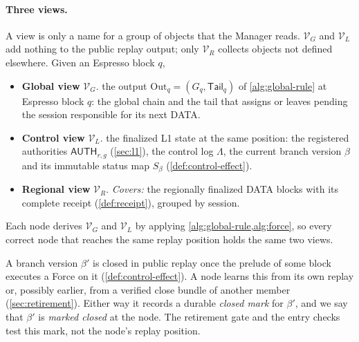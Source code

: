 \documentclass[11pt,a4paper]{article}
\newcommand{\tagg}[1]{\ensuremath{\mathsf{#1}}}
\newcommand{\defterm}[1]{\textcolor{rrBlue}{\textit{#1}}}
\begin{document}
\paragraph{Three views.}
A view is only a name for a group of objects that the Manager reads.
$\mathcal V_G$ and $\mathcal V_L$ add nothing to the public replay
output; only $\mathcal V_R$ collects objects not defined elsewhere. Given an Espresso block $q$,
\begin{itemize}
\item \textbf{Global view} $\mathcal V_G$. the output
$\mathrm{Out}_q=(G_q,\mathsf{Tail}_q)$ of \cref{alg:global-rule} at Espresso
block $q$: the global chain and the tail that assigns or leaves pending
the session responsible for its next DATA.
\item \textbf{Control view} $\mathcal V_L$. the finalized
L1 state at the same position: the registered authorities
$\tagg{AUTH}_{r,g}$ (\cref{sec:l1}), the control log $\Lambda$, the
current branch version $\beta$ and its immutable status map $S_\beta$
(\cref{def:control-effect}).
\item \textbf{Regional view} $\mathcal V_R$. \emph{Covers:} the
regionally finalized DATA blocks with its complete
receipt (\cref{def:receipt}), grouped by session. 
\end{itemize}

Each node derives $\mathcal V_G$ and $\mathcal V_L$ by applying
\cref{alg:global-rule,alg:force}, so every correct node that
reaches the same replay position holds the same two views.

A branch version $\beta'$ is closed in public replay once the prelude
of some block executes a Force on it (\cref{def:control-effect}). A node
learns this from its own replay or, possibly earlier, from a verified
close bundle of another member (\cref{sec:retirement}). Either way it
records a durable \defterm{closed mark} for $\beta'$, and we say that
$\beta'$ is \defterm{marked closed} at the node. The retirement gate and
the entry checks test this mark, not the node's replay position.
\end{document}
